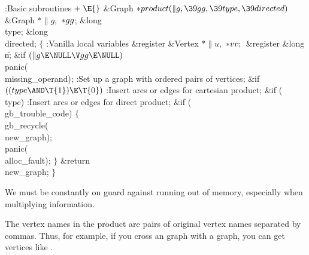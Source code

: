 \B{}:Basic subroutines\X${}\mathrel+\E{}$\6
\&{Graph} ${}{*}\\{product}(\|g,\39\\{gg},\39\\{type},\39\\{directed}){}$\1\1\6
\&{Graph} ${}{*}\|g,{}$ ${}{*}\\{gg}{}$;\6
\&{long} \\{type};%
\6
\&{long} \\{directed};\2\2\6
${}\{{}$\5
\1:Vanilla local variables\X\5
\hbox{}\6{}\&{register} \&{Vertex} ${}{*}\|u,{}$ ${}{*}\\{vv};{}$\6
\&{register} \&{long} \|n;\7
\&{if} ${}(\|g\E\NULL\V\\{gg}\E\NULL){}$\1\5
\\{panic}(\\{missing\_operand});\2\6
:Set up a graph with ordered pairs of vertices\X;\6
\&{if} ${}((\\{type}\AND\T{1})\E\T{0}){}$\1\5
:Insert arcs or edges for cartesian product\X;\2\6
\&{if} (\\{type})\1\5
:Insert arcs or edges for direct product\X;\2\6
\&{if} (\\{gb\_trouble\_code})\5
${}\{{}$\1\6
\\{gb\_recycle}(\\{new\_graph});\6
\\{panic}(\\{alloc\_fault});\6
\4${}\}{}$\2\6
\&{return} \\{new\_graph};\6
\4${}\}{}$\2\par
\fi

We must be constantly on guard against running out of memory, especially
when multiplying information.

The vertex names in the product are pairs of original vertex names separated
by commas. Thus, for example, if you cross an  graph with a 
graph, you can get vertices like .

